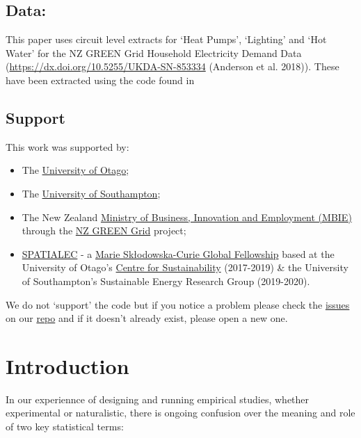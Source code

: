 \documentclass[]{article}
\providecommand{\tightlist}{%
  \setlength{\itemsep}{0pt}\setlength{\parskip}{0pt}}
\theoremstyle{definition}
\theoremstyle{definition}
\theoremstyle{definition}
\theoremstyle{remark}
\begin{document}
\subsection{Data:}\label{data}

This paper uses circuit level extracts for `Heat Pumps', `Lighting' and
`Hot Water' for the NZ GREEN Grid Household Electricity Demand Data
(\url{https://dx.doi.org/10.5255/UKDA-SN-853334} (Anderson et al.
2018)). These have been extracted using the code found in

\subsection{Support}\label{support}

This work was supported by:

\begin{itemize}
\tightlist
\item
  The \href{https://www.otago.ac.nz/}{University of Otago};
\item
  The \href{https://www.southampton.ac.uk/}{University of Southampton};
\item
  The New Zealand \href{http://www.mbie.govt.nz/}{Ministry of Business,
  Innovation and Employment (MBIE)} through the
  \href{https://www.otago.ac.nz/centre-sustainability/research/energy/otago050285.html}{NZ
  GREEN Grid} project;
\item
  \href{http://www.energy.soton.ac.uk/tag/spatialec/}{SPATIALEC} - a
  \href{http://ec.europa.eu/research/mariecurieactions/about-msca/actions/if/index_en.htm}{Marie
  Skłodowska-Curie Global Fellowship} based at the University of Otago's
  \href{http://www.otago.ac.nz/centre-sustainability/staff/otago673896.html}{Centre
  for Sustainability} (2017-2019) \& the University of Southampton's
  Sustainable Energy Research Group (2019-2020).
\end{itemize}

We do not `support' the code but if you notice a problem please check
the \href{https://github.com/CfSOtago/GREENGrid/issues}{issues} on our
\href{https://github.com/CfSOtago/GREENGrid}{repo} and if it doesn't
already exist, please open a new one.

\newpage

\section{Introduction}\label{introduction}

In our experiennce of designing and running empirical studies, whether
experimental or naturalistic, there is ongoing confusion over the
meaning and role of two key statistical terms:
\end{document}
